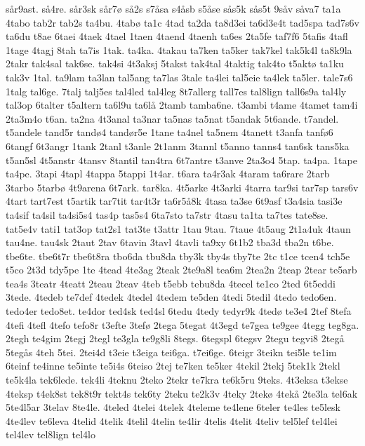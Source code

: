 s^^e5r9ast.
s^^e54re.
s^^e5r3sk
s^^e5r7^^f8
s^^e52s
s7^^e5sa
s4^^e5sb
s5^^e5se
s^^e5s5k
s^^e5s5t
9s^^e5v
s^^e5va7
ta1a
4tabo
tab2r
tab2s
ta4bu.
4tab^^f8
ta1c
4tad
ta2da
ta8d3ei
ta6d3e4t
tad5spa
tad7s6v
ta6du
t8ae
6taei
4taek
4tael
1taen
4taend
4taenh
ta6es
2ta5fe
taf7f6
5tafis
4tafl
1tage
4tagj
8tah
ta7is
1tak.
ta4ka.
4takau
ta7ken
ta5ker
tak7kel
tak5k4l
ta8k9la
2takr
tak4sal
tak6se.
tak4si
4t3aksj
5takst
tak4tal
4taktig
tak4to
t5akt^^f8
ta1ku
tak3v
1tal.
ta9lam
ta3lan
tal5ang
ta7las
3tale
ta4lei
tal5eie
ta4lek
ta5ler.
tale7s6
1talg
tal6ge.
7talj
talj5es
tal4led
tal4leg
8t7allerg
tall7es
tal8lign
tall6s9a
tal4ly
tal3op
6talter
t5altern
ta6l9u
ta6l^^e5
2tamb
tamba6ne.
t3ambi
t4ame
4tamet
tam4i
2ta3m4o
t6an.
ta2na
4t3anal
ta3nar
ta5nas
ta5nat
t5andak
5t6ande.
t7andel.
t5andele
tand5r
tand^^f84
tand^^f8r5e
1tane
ta4nel
ta5nem
4tanett
t3anfa
tanf^^f86
6tangf
6t3angr
1tank
2tanl
t3anle
2t1anm
3tannl
t5anno
tanns4
tan6sk
tans5ka
t5an5sl
4t5anstr
4tansv
8tantil
tan4tra
6t7antre
t3anve
2ta3o4
5tap.
ta4pa.
1tape
ta4pe.
3tapi
4tapl
4tappa
5tappi
1t4ar.
t6ara
ta4r3ak
4taram
ta6rare
2tarb
3tarbo
5tarb^^f8
4t9arena
6t7ark.
tar8ka.
4t5arke
4t3arki
4tarra
tar9si
tar7sp
tars6v
4tart
tart7est
t5artik
tar7tit
tar4t3r
ta6r5^^e58k
4tasa
ta3se
6t9asf
t3a4sia
tasi3e
ta4sif
ta4sil
ta4si5s4
tas4p
tas5s4
6ta7sto
ta7str
4tasu
ta1ta
ta7tes
tate8se.
tat5e4v
tati1
tat3op
tat2s1
tat3te
t3attr
1tau
9tau.
7taue
4t5aug
2t1a4uk
4taun
tau4ne.
tau4sk
2taut
2tav
6tavin
3tavl
4tavli
ta9xy
6t1b2
tba3d
tba2n
t6be.
tbe6te.
tbe6t7r
tbe6t8ra
tbo6da
tbu8da
tby3k
tby4s
tby7te
2tc
t1ce
tcen4
tch5e
t5co
2t3d
tdy5pe
1te
4tead
4te3ag
2teak
2te9a8l
tea6m
2tea2n
2teap
2tear
te5arb
tea4s
3teatr
4teatt
2teau
2teav
4teb
t5ebb
tebu8da
4tecel
te1co
2ted
6t5eddi
3tede.
4tedeb
te7def
4tedek
4tedel
4tedem
te5den
4tedi
5tedil
4tedo
tedo6en.
tedo4er
tedo8et.
te4dor
ted4sk
ted4sl
6tedu
4tedy
tedyr9k
4ted^^f8
te3e4
2tef
8tefa
4tefi
4tefl
4tefo
tefo8r
t3efte
3tef^^f8
2tega
5tegat
4t3egd
te7gea
te9gee
4tegg
teg8ga.
2tegh
te4gim
2tegj
2tegl
te3gla
te9g8li
8tegs.
6tegspl
6tegsv
2tegu
tegvi8
2teg^^e5
5teg^^e5s
4teh
5tei.
2tei4d
t3eie
t3eiga
tei6ga.
t7ei6ge.
6teigr
3teikn
tei5le
te1im
6teinf
te4inne
te5inte
te5i4s
6teiso
2tej
te7ken
te5ker
4tekil
2tekj
5tek1k
2tekl
te5k4la
tek6lede.
tek4li
4teknu
2teko
2tekr
te7kra
te6k5ru
9teks.
4t3eksa
t3ekse
4teksp
t4ek8st
tek8t9r
tekt4s
tek6ty
2teku
te2k3v
4teky
2tek^^f8
4tek^^e5
2te3la
tel6ak
5te4l5ar
3telav
8te4le.
4teled
4telei
4telek
4teleme
te4lene
6teler
te4les
te5lesk
4te4lev
te6leva
4telid
4telik
4telil
4telin
te4lir
4telis
4telit
4teliv
tel5lef
tel4lei
tel4lev
tel8lign
tel4lo
